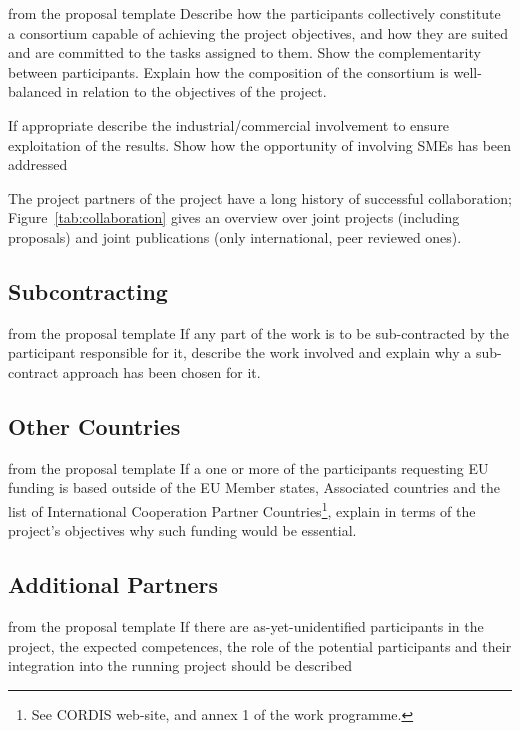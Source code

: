 \begin{todo}{from the proposal template}
  Describe how the participants collectively constitute a consortium capable of achieving
  the project objectives, and how they are suited and are committed to the tasks assigned
  to them. Show the complementarity between participants. Explain how the composition of
  the consortium is well-balanced in relation to the objectives of the project.  

  If appropriate describe the industrial/commercial involvement to ensure exploitation of
  the results. Show how the opportunity of involving SMEs has been addressed
\end{todo}

The project partners of the \pn project have a long history of successful collaboration;
Figure~\ref{tab:collaboration} gives an overview over joint projects (including proposals) and
joint publications (only international, peer reviewed ones).

% 
\coherencetable

\subsection{Subcontracting}\label{sec:subcontracting}
\begin{todo}{from the proposal template}
  If any part of the work is to be sub-contracted by the participant responsible for it,
  describe the work involved and explain why a sub-contract approach has been chosen for
  it.
\end{todo}
\subsection{Other Countries}\label{sec:other-countries}
\begin{todo}{from the proposal template}
  If a one or more of the participants requesting EU funding is based outside of the EU
  Member states, Associated countries and the list of International Cooperation Partner
  Countries\footnote{See CORDIS web-site, and annex 1 of the work programme.}, explain in
  terms of the project’s objectives why such funding would be essential.
\end{todo}

\subsection{Additional Partners}\label{sec:assoc-partner}
\begin{todo}{from the proposal template}
  If there are as-yet-unidentified participants in the project, the expected competences,
  the role of the potential participants and their integration into the running project
  should be described
\end{todo}

